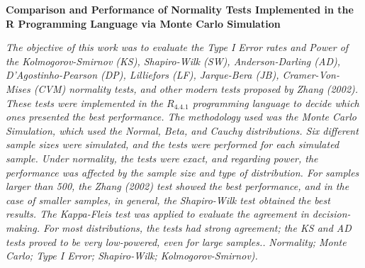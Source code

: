 \documentclass[a4paper,11pt]{article} %
\begin{document}
\begin{center}
    {\large {\bf Comparison and Performance of Normality Tests Implemented in the R Programming Language via Monte Carlo Simulation}\vspace{0.3cm}}
\end{center}
\begin{small}
 {\it 
    The objective of this work was to evaluate the Type I Error rates and Power of the Kolmogorov-Smirnov (KS), Shapiro-Wilk (SW), Anderson-Darling (AD), D’Agostinho-Pearson (DP), Lilliefors (LF), Jarque-Bera (JB), Cramer-Von-Mises (CVM) normality tests, and other modern tests proposed by Zhang (2002). These tests were implemented in the $R_{4.4.1}$ programming language to decide which ones presented the best performance. The methodology used was the Monte Carlo Simulation, which used the Normal, Beta, and Cauchy distributions. Six different sample sizes were simulated, and the tests were performed for each simulated sample. Under normality, the tests were exact, and regarding power, the performance was affected by the sample size and type of distribution. For samples larger than 500, the Zhang (2002) test showed the best performance, and in the case of smaller samples, in general, the Shapiro-Wilk test obtained the best results. The Kappa-Fleis test was applied to evaluate the agreement in decision-making. For most distributions, the tests had strong agreement; the KS and AD tests proved to be very low-powered, even for large samples..}\vspace{0.3cm}
  {\it Normality; Monte Carlo; Type I Error; Shapiro-Wilk; Kolmogorov-Smirnov).\vspace{0.3cm}}
\end{small}
\newpage                                                                                   
\pagestyle{fancy}                                                                          
\renewcommand{\thefootnote}{\roman{footnote}}                                              
\lhead{}
\chead{\small \slshape}
\rhead{\thepage}
\lfoot{}
\rfoot{}
\end{document}
